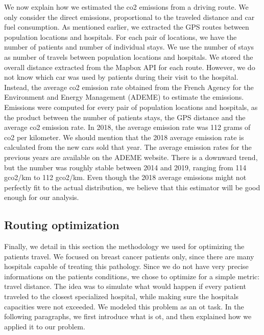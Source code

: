 We now explain how we estimated the \ac{co2} emissions from a driving route. We
only consider the direct emissions, proportional to the traveled distance and
car fuel consumption. As mentioned earlier, we extracted the GPS routes between
population locations and hospitals. For each pair of locations, we have the
number of patients and number of individual stays. We use the number of stays as
number of travels between population locations and hospitals. We stored the
overall distance extracted from the Mapbox API for each route. However, we do
not know which car was used by patients during their visit to the hospital.
Instead, the average \ac{co2} emission rate obtained from the French Agency for
the Environment and Energy Management (ADEME) to estimate the emissions.
Emissions were computed for every pair of population locations and hospitals, as
the product between the number of patients stays, the GPS distance and the
average \ac{co2} emission rate. In 2018, the average emission rate was 112 grams
of \ac{co2} per kilometer. We should mention that the 2018 average emission rate
is calculated from the new cars sold that year. The average emission rates for
the previous years are available on the ADEME website. There is a downward
trend, but the number was roughly stable between 2014 and 2019, ranging from 114
g\ac{co2}/km to 112 g\ac{co2}/km. Even though the 2018 average emissions might not
perfectly fit to the actual distribution, we believe that this estimator will be
good enough for our analysis.

\subsection{Routing optimization}

Finally, we detail in this section the methodology we used for optimizing the
patients travel. We focused on breast cancer patients only, since there are
many hospitals capable of treating this pathology. Since we do not have
very precise informations on the patients conditions, we chose to optimize
for a simple metric: travel distance. The idea was to simulate what would
happen if every patient traveled to the closest specialized hospital, while
making sure the hospitals capacities were not exceeded. We modeled this problem
as an \acf{ot} task. In the following paragraphs, we first introduce what is
\ac{ot}, and then explained how we applied it to our problem.

